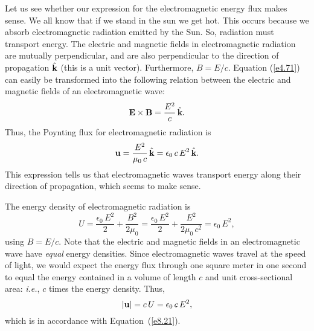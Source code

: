 Let us see whether our expression for the electromagnetic energy flux makes sense.
We all know that if we stand in the sun we get hot. This
occurs because we absorb electromagnetic radiation emitted by the Sun. So,
radiation must transport energy. The electric and magnetic fields in electromagnetic
radiation are mutually perpendicular, and are also perpendicular to the direction
of propagation $\hat{\bf k}$ (this is a unit vector). Furthermore, $B=E/c$. 
Equation (\ref{e4.71}) can easily be transformed into the following relation between
the electric and magnetic fields of an electromagnetic wave:
\begin{equation}
{\bf E} \times{\bf B} = \frac{E^2}{c}\, \hat{\bf k}.
\end{equation}
Thus, the Poynting flux for electromagnetic radiation is
\begin{equation}\label{e8.21}
{\bf u} = \frac{E^2}{\mu_0\, c} \,\hat{\bf k} = \epsilon_0 \,c \,E^2\, \hat{\bf k}.
\end{equation}
This expression tells us that electromagnetic waves transport energy along their
direction of propagation, which seems to make sense. 

The energy density of electromagnetic radiation is
\begin{equation}
U = \frac{\epsilon_0\,E^2}{2} + \frac{B^2}{2\mu_0} = \frac{\epsilon_0\,E^2}{2}
+ \frac{E^2}{2\mu_0 \,c^2} = \epsilon_0 \,E^2,
\end{equation}
using $B=E/c$.   Note that 
the electric and magnetic fields in an electromagnetic wave have {\em equal}\/ energy densities. 
Since electromagnetic waves travel at the speed of light, we would
expect the energy flux through one square meter in one second to equal the energy
contained in a volume of length $c$ and unit cross-sectional area: {\em i.e.},
$c$ times the energy density. Thus,
\begin{equation}
|{\bf u}| = c\,U = \epsilon_0\, c\,  E^2,
\end{equation}
which is in accordance with Equation~(\ref{e8.21}). 

